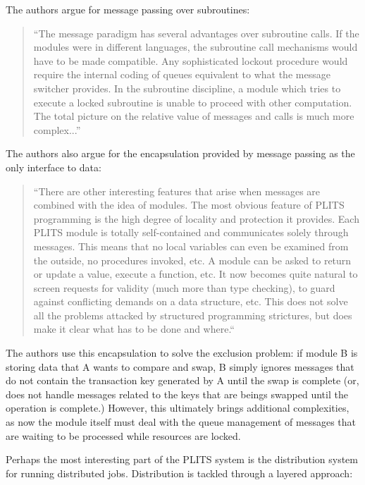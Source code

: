 The authors argue for message passing over subroutines:

\begin{quote}
``The message paradigm has several advantages over subroutine calls. If the modules were in different languages, the subroutine call mechanisms would have to be made compatible. Any sophisticated lockout procedure would require the internal coding of queues equivalent to what the message switcher provides. In the subroutine discipline, a module which tries to execute a locked subroutine is unable to proceed with other computation. The total picture on the relative value of messages and calls is much more complex...''	
\end{quote}

The authors also argue for the encapsulation provided by message passing as the only interface to data:

\begin{quote}
``There are other interesting features that arise when messages are combined with the idea of modules. The most obvious feature of PLITS programming is the high degree of locality and protection it provides. Each PLITS module is totally self-contained and communicates solely through messages. This means that no local variables can even be examined from the outside, no procedures invoked, etc. A module can be asked to return or update a value, execute a function, etc. It now becomes quite natural to screen requests for validity (much more than type checking), to guard against conflicting demands on a data structure, etc. This does not solve all the problems attacked by structured programming strictures, but does make it clear what has to be done and where.``
\end{quote}

The authors use this encapsulation to solve the exclusion problem: if module B is storing data that A wants to compare and swap, B simply ignores messages that do not contain the transaction key generated by A until the swap is complete (or, does not handle messages related to the keys that are beings swapped until the operation is complete.)  However, this ultimately brings additional complexities, as now the module itself must deal with the queue management of messages that are waiting to be processed while resources are locked.

Perhaps the most interesting part of the PLITS system is the distribution system for running distributed jobs.  Distribution is tackled through a layered approach: 

